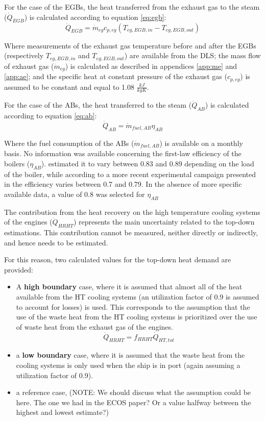 \documentclass[preprint,12pt]{elsarticle}
\begin{document}
For the case of the EGBs, the heat transferred from the exhaust gas to the steam ($\dot{Q}_{EGB}$) is calculated according to equation \ref{eq:egb}:
\begin{equation}
\dot{Q}_{EGB} = \dot{m}_{eg} c_{p,eg} (T_{eg,EGB,in} - T_{eg,EGB,out})
\end{equation}\label{eq:egb}

Where measurements of the exhaust gas temperature before and after the EGBs (respectively $T_{eg,EGB,in}$ and $T_{eg,EGB,out}$) are available from the DLS; the mass flow of exhaust gas ($\dot{m}_{eg}$) is calculated as described in appendices \ref{app:me} and \ref{app:ae}; and the specific heat at constant pressure of the exhaust gas ($c_{p,eg}$) is assumed to be constant and equal to 1.08 $\frac{kJ}{kgK}$.

For the case of the ABs, the heat transferred to the steam ($\dot{Q}_{AB}$) is calculated according to equation \ref{eq:ab}:
\begin{equation}
\dot{Q}_{AB} = \dot{m}_{fuel,AB} \eta_{AB}
\end{equation} \label{eq:ab}

Where the fuel consumption of the ABs ($\dot{m}_{fuel,AB}$) is available on a monthly basis. No information was available concerning the first-law efficiency of the boilers ($ \eta_{AB}$). \cite{Cohen1962} estimated it to vary between 0.83 and 0.89 depending on the load of the boiler, while according to a more recent experimental campaign presented in \cite{Mrzljak2017} the efficiency varies between 0.7 and 0.79. In the absence of more specific available data, a value of 0.8 was selected for $ \eta_{AB}$

The contribution from the heat recovery on the high temperature cooling systems of the engines ($\dot{Q}_{HRHT}$) represents the main uncertainty related to the top-down estimations. This contribution cannot be measured, neither directly or indirectly, and hence needs to be estimated. 

For this reason, two calculated values for the top-down heat demand are provided:
\begin{itemize}
	\item A \textbf{high boundary} case, where it is assumed that almost all of the heat available from the HT cooling systems (an utilization factor of 0.9 is assumed to account for losses) is used. This corresponds to the assumption that the use of the waste heat from the HT cooling systems is prioritized over the use of waste heat from the exhaust gas of the engines.
	\begin{equation}
	\dot{Q}_{HRHT} = f_{HRHT} \dot{Q}_{HT,tot} 
	\end{equation}
	\item a \textbf{low boundary} case, where it is assumed that the waste heat from the cooling systems is only used when the ship is in port (again assuming a utilization factor of 0.9). 
	\item a reference case, (NOTE: We should discuss what the assumption could be here. The one we had in the ECOS paper? Or a value halfway between the highest and lowest estimate?)
\end{itemize}
\end{document}
